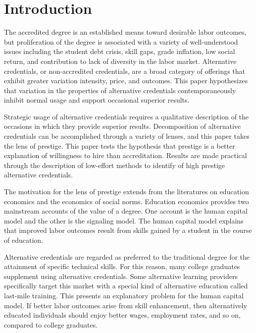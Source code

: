 \documentclass[review]{elsarticle}
\begin{document}
\pagebreak
\linenumbers

\section{Introduction}

The accredited degree is an established means toward desirable labor outcomes,
but proliferation of the degree is associated with a variety of well-understood issues including
the student debt crisis, skill gaps, grade inflation, low social return,
and contribution to lack of diversity in the labor market.
Alternative credentials, or non-accredited credentials,
are a broad category of offerings that exhibit greater variation intensity, price, and outcomes\cite{urdan_2020}.
This paper hypothesizes that variation in the properties of alternative credentials
contemporaneously inhibit normal usage and support occasional superior results.

Strategic usage of alternative credentials requires a qualitative description of the occasions in which they provide superior results.
Decomposition of alternative credentials can be accomplished through a variety of lenses,
and this paper takes the lens of prestige.
This paper tests the hypothesis that prestige is a better explanation of willingness to hire
than accreditation.
Results are made practical through the description of low-effort methods to identify of high prestige alternative credentials.

The motivation for the lens of prestige extends from the literatures on education economics and the economics of social norms.
Education economics provides two mainstream accounts of the value of a degree.
One account is the human capital model and the other is the signaling model.
The human capital model explains that improved labor outcomes result from skills gained by a student in the course of education.

Alternative credentials are regarded as preferred to the traditional degree for the attainment of specific technical skills\cite{craig2018new}.
For this reason, many college graduates supplement using alternative credentials.
Some alternative learning providers specifically target this market with a special kind of alternative education called last-mile training.
This presents an explanatory problem for the human capital model.
If better labor outcomes arise from skill enhancement,
then alternatively educated individuals should enjoy better wages, employment rates, and so on,
compared to college graduates.
\end{document}
